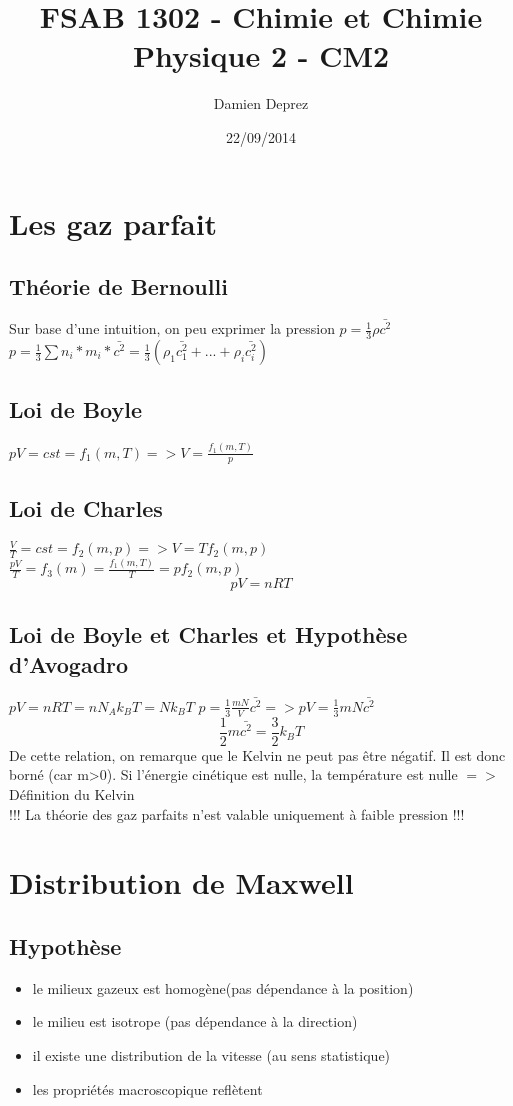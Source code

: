 \documentclass{report}
\begin{document}
\title {FSAB 1302 - Chimie et Chimie Physique 2 - CM2}
\date{22/09/2014}
\author{Damien Deprez}

\maketitle
\tableofcontents

\chapter{Les gaz parfait}
\section{Théorie de Bernoulli}

Sur base d'une intuition, on peu exprimer la pression $p=\frac{1}{3}\rho \bar{c^2}$
$p=\frac{1}{3} \sum{}{}{n_i*m_i*\bar{c^2}}=\frac{1}{3}(\rho_1\bar{c_1^2}+...+\rho_i\bar{c_i^2})$

\section{Loi de Boyle}
$pV=cst=f_1(m,T) => V=\frac{f_1(m,T)}{p}$
\section{Loi de Charles}
$\frac{V}{T}=cst=f_2(m,p) =>  V=Tf_2(m,p)$\\
$\frac{pV}{T}=f_3(m)=\frac{f_1(m,T)}{T}=pf_2(m,p)$
$$pV=nRT$$
\section{Loi de Boyle et Charles et Hypothèse d'Avogadro}
$pV=nRT=nN_Ak_BT=Nk_BT$
$p=\frac{1}{3}\frac{mN}{V}\bar{c^2}=>pV=\frac{1}{3}mN\bar{c^2}$
$$\frac{1}{2}m\bar{c^2}=\frac{3}{2}k_BT$$
De cette relation, on remarque que le Kelvin ne peut pas être négatif. Il est donc borné (car m>0). Si l'énergie cinétique est nulle, la température est nulle $=>$ Définition du Kelvin\\
!!! La théorie des gaz parfaits n'est valable uniquement à faible pression !!!

\chapter{Distribution de Maxwell}
\section{Hypothèse}
\begin{itemize}
\item le milieux gazeux est homogène(pas dépendance à la position)
\item le milieu est isotrope (pas dépendance à la direction)
\item il existe une distribution de la vitesse (au sens statistique)
\item les propriétés macroscopique reflètent 
\end{itemize}
\end{document}
